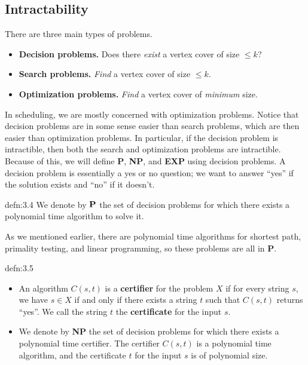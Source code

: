 \subsection{Intractability}\label{subsec:3.2}
There are three main types of problems. 
\begin{itemize}
    \item {\bf Decision problems.} Does there \emph{exist} a vertex cover of 
    size $\leq k$?
    \item {\bf Search problems.} \emph{Find} a vertex cover of size $\leq k$. 
    \item {\bf Optimization problems.} \emph{Find} a vertex cover of 
    \emph{minimum} size. 
\end{itemize}
In scheduling, we are mostly concerned with optimization problems. Notice that 
decision problems are in some sense easier than search problems, which are then 
easier than optimization problems. In particular, if the decision problem 
is intractible, then both the search and optimization problems are intractible.
Because of this, we will define {\bf P}, {\bf NP}, and {\bf EXP} using decision 
problems. A decision problem is essentially a yes or no question; we want to 
answer ``yes'' if the solution exists and ``no'' if it doesn't. 

\begin{defn}{defn:3.4}
    We denote by ${\bf P}$ the set of decision problems for which there 
    exists a polynomial time algorithm to solve it. 
\end{defn}

As we mentioned earlier, there are polynomial time algorithms for shortest 
path, primality testing, and linear programming, so these problems are all 
in {\bf P}. 

\begin{defn}{defn:3.5}
    \begin{itemize}
        \item An algorithm $C(s, t)$ is a {\bf certifier} for the problem $X$ if 
        for every string $s$, we have $s \in X$ if and only if there exists a 
        string $t$ such that $C(s, t)$ returns ``yes''. We call the string $t$ 
        the {\bf certificate} for the input $s$. 
        \item We denote by {\bf NP} the set of decision problems for which there exists 
        a polynomial time certifier. The certifier $C(s, t)$ is a 
        polynomial time algorithm, and the certificate $t$ for the input 
        $s$ is of polynomial size. 
    \end{itemize}
\end{defn}


